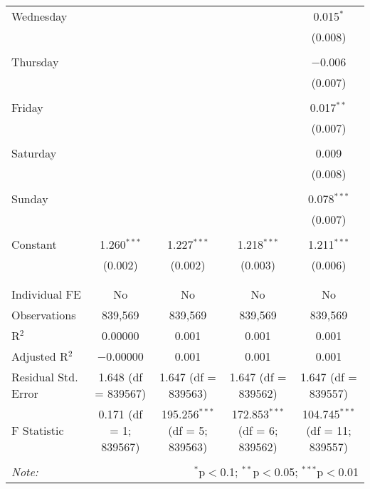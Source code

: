 \documentclass[
]{article}
\begin{document}
\begin{table}[!htbp]
{\begin{tabular}{@{\extracolsep{5pt}}lcccc}
 Wednesday &  &  &  & 0.015$^{*}$ \\ 
  &  &  &  & (0.008) \\ 
  & & & & \\ 
 Thursday &  &  &  & $-$0.006 \\ 
  &  &  &  & (0.007) \\ 
  & & & & \\ 
 Friday &  &  &  & 0.017$^{**}$ \\ 
  &  &  &  & (0.007) \\ 
  & & & & \\ 
 Saturday &  &  &  & 0.009 \\ 
  &  &  &  & (0.008) \\ 
  & & & & \\ 
 Sunday &  &  &  & 0.078$^{***}$ \\ 
  &  &  &  & (0.007) \\ 
  & & & & \\ 
 Constant & 1.260$^{***}$ & 1.227$^{***}$ & 1.218$^{***}$ & 1.211$^{***}$ \\ 
  & (0.002) & (0.002) & (0.003) & (0.006) \\ 
  & & & & \\ 
\hline \\[-1.8ex] 
Individual FE & No & No & No & No \\ 
Observations & 839,569 & 839,569 & 839,569 & 839,569 \\ 
R$^{2}$ & 0.00000 & 0.001 & 0.001 & 0.001 \\ 
Adjusted R$^{2}$ & $-$0.00000 & 0.001 & 0.001 & 0.001 \\ 
Residual Std. Error & 1.648 (df = 839567) & 1.647 (df = 839563) & 1.647 (df = 839562) & 1.647 (df = 839557) \\ 
F Statistic & 0.171 (df = 1; 839567) & 195.256$^{***}$ (df = 5; 839563) & 172.853$^{***}$ (df = 6; 839562) & 104.745$^{***}$ (df = 11; 839557) \\ 
\hline 
\hline \\[-1.8ex] 
\textit{Note:}  & \multicolumn{4}{r}{$^{*}$p$<$0.1; $^{**}$p$<$0.05; $^{***}$p$<$0.01} \\ 
\end{tabular}
} 
\end{table} 
\newpage
\end{document}

